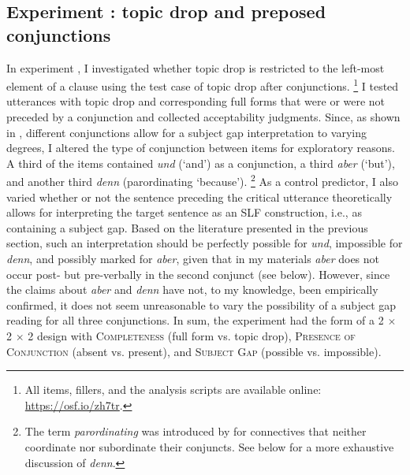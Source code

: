 \subsection{Experiment : topic drop and preposed conjunctions }
\label{sec:exp.conjunctions}
In experiment , I investigated whether topic drop is restricted to the left-most element of a clause using the test case of topic drop after conjunctions.%
\footnote{All items, fillers, and the analysis scripts are available online: \url{https://osf.io/zh7tr}.}
%
I tested utterances with topic drop and corresponding full forms that were or were not preceded by a conjunction and collected acceptability judgments.
Since, as shown in , different conjunctions allow for a subject gap interpretation to varying degrees, I altered the type of conjunction between items for exploratory reasons.
A third of the items contained \textit{und} (`and') as a conjunction, a third \textit{aber} (`but'), and another third \textit{denn} (parordinating `because').%
\footnote{The term \textit{parordinating} was introduced by \cite[329]{hohle1986} for connectives that neither coordinate nor subordinate their conjuncts.
See below for a more exhaustive discussion of \textit{denn}.}
%
As a control predictor, I also varied whether or not the sentence preceding the critical utterance theoretically allows for interpreting the target sentence as an SLF construction, i.e., as containing a subject gap.
Based on the literature presented in the previous section, such an interpretation should be perfectly possible for \textit{und}, impossible for \textit{denn}, and possibly marked for \textit{aber}, given that in my materials \textit{aber} does not occur post- but pre-verbally in the second conjunct (see below).
However, since the claims about \textit{aber} and \textit{denn} have not, to my knowledge, been empirically confirmed, it does not seem unreasonable to vary the possibility of a subject gap reading for all three conjunctions.
In sum, the experiment had the form of a 2 $\times$ 2 $\times$ 2 design with \textsc{Completeness} (full form vs. topic drop), \textsc{Presence of Conjunction} (absent vs. present), and \textsc{Subject Gap} (possible vs. impossible).

